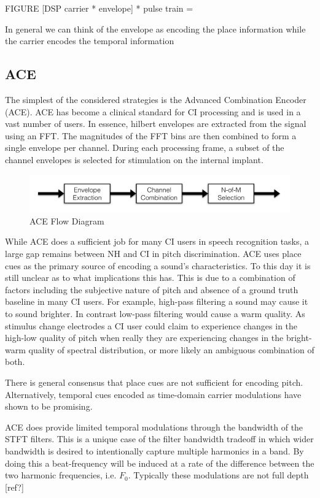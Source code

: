 \documentclass [11pt, proquest] {uwthesis}[2015/03/03]
\begin{document}
FIGURE
[DSP carrier * envelope] * pulse train = ~~~

In general we can think of the envelope as encoding the place information while the carrier encodes the temporal information

\subsection{ACE}

The simplest of the considered strategies is the Advanced Combination Encoder (ACE).  ACE has become a clinical standard for CI processing and is used in a vast number of users.  In essence, hilbert envelopes are extracted from the signal using an FFT.  The magnitudes of the FFT bins are then combined to form a single envelope per channel.  During each processing frame, a subset of the channel envelopes is selected for stimulation on the internal implant.

\begin{figure}[!ht]
  \centering
    \includegraphics[width=1\textwidth]{ACE_flow_diagramTEMP}   
    \caption{ACE Flow Diagram}
\end{figure}

While ACE does a sufficient job for many CI users in speech recognition tasks, a large gap remains between NH and CI in pitch discrimination.  ACE uses place cues as the primary source of encoding a sound's characteristics.  To this day it is still unclear as to what implications this has.  This is due to a combination of factors including the subjective nature of pitch and absence of a ground truth baseline in many CI users.  For example, high-pass filtering a sound may cause it to sound brighter.  In contrast low-pass filtering would cause a warm quality.  As stimulus change electrodes a CI user could claim to experience changes in the high-low quality of pitch when really they are experiencing changes in the bright-warm quality of spectral distribution, or more likely an ambiguous combination of both.

There is general consensus that place cues are not sufficient for encoding pitch.  Alternatively, temporal cues encoded as time-domain carrier modulations have shown to be promising.

ACE does provide limited temporal modulations through the bandwidth of the STFT filters.  This is a unique case of the filter bandwidth tradeoff in which wider bandwidth is desired to intentionally capture multiple harmonics in a band.  By doing this a beat-frequency will be induced at a rate of the difference between the two harmonic frequencies, i.e. $F_0$.  Typically these modulations are not full depth [ref?]
\end{document}
